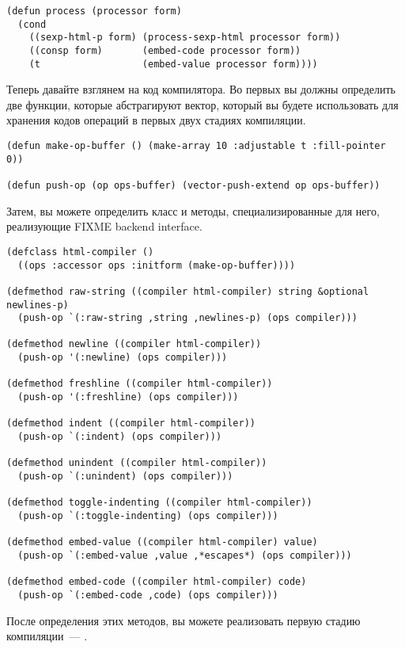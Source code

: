 \begin{lstlisting}
(defun process (processor form)
  (cond
    ((sexp-html-p form) (process-sexp-html processor form))
    ((consp form)       (embed-code processor form))
    (t                  (embed-value processor form))))
\end{lstlisting}

Теперь давайте взглянем на код компилятора.  Во первых вы должны определить две функции,
которые абстрагируют вектор, который вы будете использовать для хранения кодов операций в
первых двух стадиях компиляции.

\begin{lstlisting}
(defun make-op-buffer () (make-array 10 :adjustable t :fill-pointer 0))

(defun push-op (op ops-buffer) (vector-push-extend op ops-buffer))
\end{lstlisting}

Затем, вы можете определить класс  и методы, специализированные для
него, реализующие FIXME backend interface.

\begin{lstlisting}
(defclass html-compiler ()
  ((ops :accessor ops :initform (make-op-buffer))))

(defmethod raw-string ((compiler html-compiler) string &optional newlines-p)
  (push-op `(:raw-string ,string ,newlines-p) (ops compiler)))

(defmethod newline ((compiler html-compiler))
  (push-op '(:newline) (ops compiler)))

(defmethod freshline ((compiler html-compiler))
  (push-op '(:freshline) (ops compiler)))

(defmethod indent ((compiler html-compiler))
  (push-op `(:indent) (ops compiler)))

(defmethod unindent ((compiler html-compiler))
  (push-op `(:unindent) (ops compiler)))

(defmethod toggle-indenting ((compiler html-compiler))
  (push-op `(:toggle-indenting) (ops compiler)))

(defmethod embed-value ((compiler html-compiler) value)
  (push-op `(:embed-value ,value ,*escapes*) (ops compiler)))

(defmethod embed-code ((compiler html-compiler) code)
  (push-op `(:embed-code ,code) (ops compiler)))
\end{lstlisting}

После определения этих методов, вы можете реализовать первую стадию компиляции~---
.

